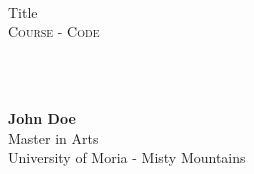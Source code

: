 {
	\parindent0pt
	\ \\ \ \\ \ \\

	\hrulefill
	\vspace{0.0cm}
	\begin{spacing}{1.1}
	{	
		\flushleft
		\fontsize{22pt}{44pt}\selectfont 
		Title
	}\\
	\textsc{Course - Code}
	\end{spacing}

	\ \\ \ \\
	{
		\textbf{John Doe}\\
		Master in Arts\\
		University of Moria - Misty Mountains\par
	}
	\ \\

	\hrulefill
}
